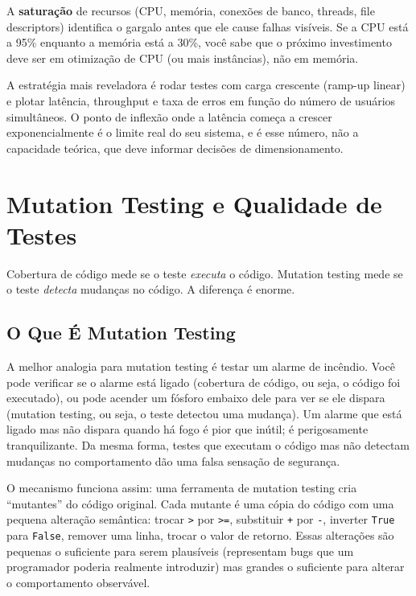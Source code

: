 A \textbf{saturação} de recursos (CPU, memória, conexões de banco, threads,
file descriptors) identifica o gargalo antes que ele cause falhas visíveis.
Se a CPU está a 95\% enquanto a memória está a 30\%, você sabe que o próximo
investimento deve ser em otimização de CPU (ou mais instâncias), não em memória.

A estratégia mais reveladora é rodar testes com carga crescente
(ramp-up linear) e plotar latência, throughput e taxa de erros em função do
número de usuários simultâneos. O ponto de inflexão onde a latência começa a
crescer exponencialmente é o limite real do seu sistema, e é esse número,
não a capacidade teórica, que deve informar decisões de dimensionamento.

\section{Mutation Testing e Qualidade de Testes}

Cobertura de código mede se o teste \textit{executa} o código. Mutation testing
mede se o teste \textit{detecta} mudanças no código. A diferença é enorme.

\subsection{O Que É Mutation Testing}

A melhor analogia para mutation testing é testar um alarme de incêndio. Você
pode verificar se o alarme está ligado (cobertura de código, ou seja, o código foi
executado), ou pode acender um fósforo embaixo dele para ver se ele dispara
(mutation testing, ou seja, o teste detectou uma mudança). Um alarme que está ligado
mas não dispara quando há fogo é pior que inútil; é perigosamente
tranquilizante. Da mesma forma, testes que executam o código mas não detectam
mudanças no comportamento dão uma falsa sensação de segurança.

O mecanismo funciona assim: uma ferramenta de mutation testing cria
``mutantes'' do código original. Cada mutante é uma cópia do código com uma
pequena alteração semântica: trocar \texttt{>} por \texttt{>=}, substituir
\texttt{+} por \texttt{-}, inverter \texttt{True} para \texttt{False}, remover
uma linha, trocar o valor de retorno. Essas alterações são pequenas o suficiente
para serem plausíveis (representam bugs que um programador poderia realmente
introduzir) mas grandes o suficiente para alterar o comportamento observável.

